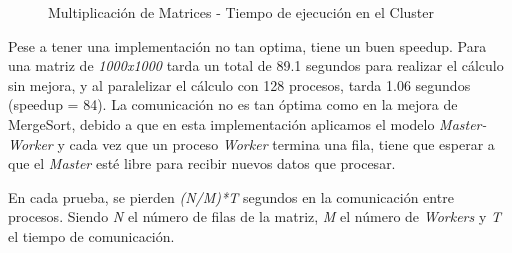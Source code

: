 			\begin{figure}[!h]
				\centering
				\caption{Multiplicación de Matrices - Tiempo de ejecución en el Cluster}
			\end{figure}
			
			
			Pese a tener una implementación no tan optima, tiene un buen speedup. Para una matriz de \textit{1000x1000} tarda un total de 89.1 segundos para realizar el cálculo sin mejora, y al paralelizar el cálculo con 128 procesos, tarda 1.06 segundos (speedup = 84). La comunicación no es tan óptima como en la mejora de MergeSort, debido a que en esta implementación aplicamos el modelo \textit{Master-Worker} y cada vez que un proceso \textit{Worker} termina una fila, tiene que esperar a que el \textit{Master} esté libre para recibir nuevos datos que procesar. 
			
			En cada prueba, se pierden \textit{(N/M)*T} segundos en la comunicación entre procesos. Siendo \textit{N} el número de filas de la matriz, \textit{M} el número de \textit{Workers} y \textit{T} el tiempo de comunicación.
			
			
		

\newpage


